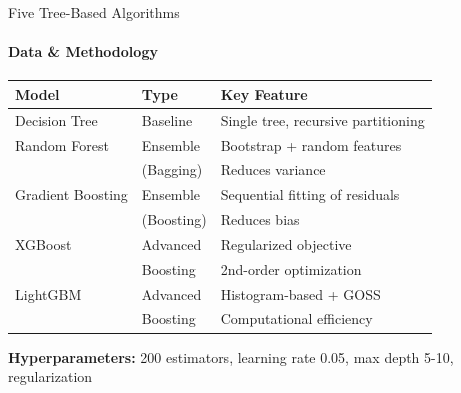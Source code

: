 \documentclass[aspectratio=169,8pt]{beamer}
\begin{document}
    \begin{frame}{Five Tree-Based Algorithms}
        \framesubtitle{Data \& Methodology}
        \begin{table}
            \centering
            \small
            \begin{tabular}{llp{5cm}}
                \toprule
                \textbf{Model} & \textbf{Type} & \textbf{Key Feature} \\
                \midrule
                Decision Tree & Baseline & Single tree, recursive partitioning \\
                \midrule
                Random Forest & Ensemble & Bootstrap + random features \\
                & (Bagging) & Reduces variance \\
                \midrule
                Gradient Boosting & Ensemble & Sequential fitting of residuals \\
                & (Boosting) & Reduces bias \\
                \midrule
                XGBoost & Advanced & Regularized objective \\
                & Boosting & 2nd-order optimization \\
                \midrule
                LightGBM & Advanced & Histogram-based + GOSS \\
                & Boosting & Computational efficiency \\
                \bottomrule
            \end{tabular}
        \end{table}

        \vspace{0.2cm}
        \textbf{Hyperparameters:} 200 estimators, learning rate 0.05, max depth 5-10, regularization
    \end{frame}
\end{document}
